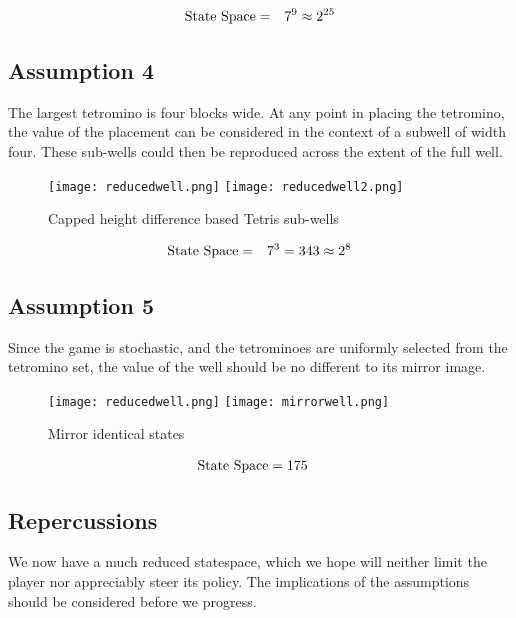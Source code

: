 \documentclass{rucsthesis}
\begin{document}
\begin{eqnarray}
\centering
\textrm{State Space} & = & 7^{9} \approx 2^{25}
\end{eqnarray}

\subsection*{Assumption 4}

The largest tetromino is four blocks wide. At any point in placing the tetromino, the value of the placement can be considered in the context of a subwell of width four. These sub-wells could then be reproduced across the extent of the full well.

\begin{figure}[h]
\centering
\texttt{[image: reducedwell.png]}
\texttt{[image: reducedwell2.png]}
\caption{Capped height difference based Tetris sub-wells}
\label{fig:redwell}
\end{figure}

\begin{eqnarray}
\centering
\textrm{State Space} & = & 7^{3} = 343 \approx 2^{8}
\end{eqnarray}

\subsection*{Assumption 5}

Since the game is stochastic, and the tetrominoes are uniformly selected from the tetromino set, the value of the well should be no different to its mirror image.

\begin{figure}[h]
\centering
\texttt{[image: reducedwell.png]}
\texttt{[image: mirrorwell.png]}
\caption{Mirror identical states}
\label{fig:mirrorwell}
\end{figure}

\begin{eqnarray}
\centering
\textrm{State Space} & = 175
\end{eqnarray}

\subsection*{Repercussions}

We now have a much reduced statespace, which we hope will neither limit the player nor appreciably steer its policy. The implications of the assumptions should be considered before we progress.
\end{document}
